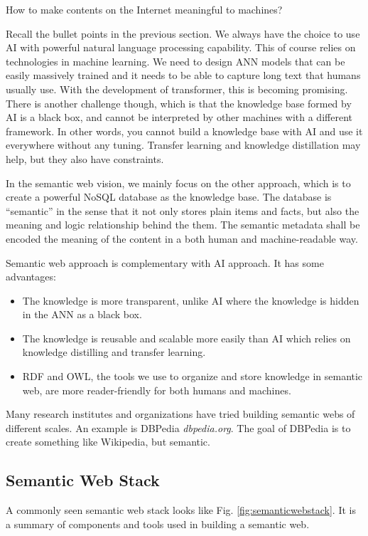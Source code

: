 How to make contents on the Internet meaningful to machines?

Recall the bullet points in the previous section. We always have the choice to use AI with powerful natural language processing capability. This of course relies on technologies in machine learning. We need to design ANN models that can be easily massively trained and it needs to be able to capture long text that humans usually use. With the development of transformer, this is becoming promising. There is another challenge though, which is that the knowledge base formed by AI is a black box, and cannot be interpreted by other machines with a different framework. In other words, you cannot build a knowledge base with AI and use it everywhere without any tuning. Transfer learning and knowledge distillation may help, but they also have constraints.

In the semantic web vision, we mainly focus on the other approach, which is to create a powerful NoSQL database as the knowledge base. The database is ``semantic'' in the sense that it not only stores plain items and facts, but also the meaning and logic relationship behind the them. The semantic metadata shall be encoded the meaning of the content in a both human and machine-readable way.

Semantic web approach is complementary with AI approach. It has some advantages:
\begin{itemize}
  \item The knowledge is more transparent, unlike AI where the knowledge is hidden in the ANN as a black box.
  \item The knowledge is reusable and scalable more easily than AI which relies on knowledge distilling and transfer learning.
  \item RDF and OWL, the tools we use to organize and store knowledge in semantic web, are more reader-friendly for both humans and machines.
\end{itemize}

Many research institutes and organizations have tried building semantic webs of different scales. An example is DBPedia \textit{dbpedia.org}. The goal of DBPedia is to create something like Wikipedia, but semantic.

\subsection{Semantic Web Stack} \label{subsec:semanticwebstack}

A commonly seen semantic web stack looks like Fig. \ref{fig:semanticwebstack}. It is a summary of components and tools used in building a semantic web.

